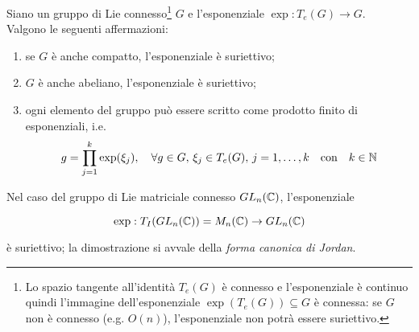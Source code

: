 \begin{theorem}
	Siano un gruppo di Lie connesso\footnote{%
		Lo spazio tangente all'identità $ T_{e}(G) $ è connesso e l'esponenziale è continuo quindi l'immagine dell'esponenziale $ \exp(T_{e}(G)) \subseteq G $ è connessa: se $ G $ non è connesso (e.g. $ O(n) $), l'esponenziale non potrà essere suriettivo.%
	} $ G $ e l'esponenziale $ \exp : T_{e}(G) \to G $.\\
	Valgono le seguenti affermazioni:
	
	\begin{enumerate}
		\item se $ G $ è anche compatto, l'esponenziale è suriettivo;
		
		\item $ G $ è anche abeliano, l'esponenziale è suriettivo;
		
		\item ogni elemento del gruppo può essere scritto come prodotto finito di esponenziali, i.e. 
		\begin{equation}
			g = \prod_{j=1}^{k} \exp(\xi_{j}) \qcomma \forall g \in G, \, \xi_{j} \in T_{e}(G), \, j=1,\dots,k \qq{con} k \in \N
		\end{equation}
	\end{enumerate}
\end{theorem}

Nel caso del gruppo di Lie matriciale connesso $ GL_{n}(\mathbb{C}) $, l'esponenziale

\begin{equation}
	\exp : T_{I}(GL_{n}(\mathbb{C})) = M_{n}(\mathbb{C}) \to GL_{n}(\mathbb{C})
\end{equation}

è suriettivo; la dimostrazione si avvale della \textit{forma canonica di Jordan}.

